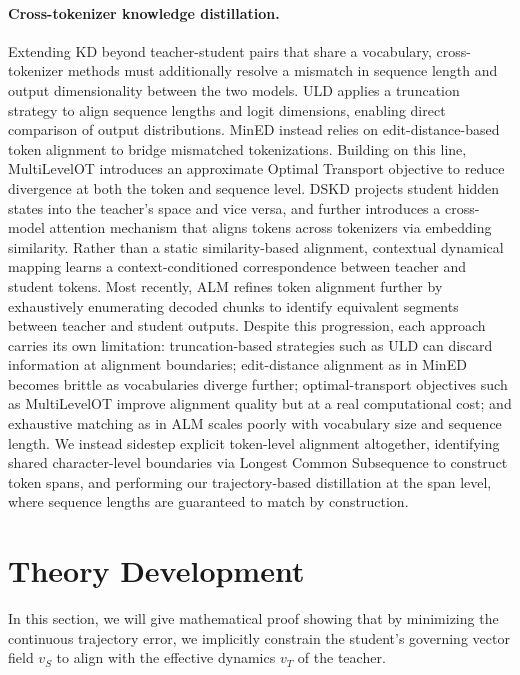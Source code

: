 \documentclass{article} %
\theoremstyle{definition}
\theoremstyle{remark}
\begin{document}
\paragraph{Cross-tokenizer knowledge distillation.} Extending KD beyond teacher-student pairs that share a vocabulary, cross-tokenizer methods must additionally resolve a mismatch in sequence length and output dimensionality between the two models. ULD \cite{boizard2025crosstokenizerdistillationuniversallogit} applies a truncation strategy to align sequence lengths and logit dimensions, enabling direct comparison of output distributions. MinED \cite{Wan2024KnowledgeFO} instead relies on edit-distance-based token alignment to bridge mismatched tokenizations. Building on this line, MultiLevelOT \cite{cui2025multileveloptimaltransportuniversal} introduces an approximate Optimal Transport objective to reduce divergence at both the token and sequence level. DSKD \cite{zhang2024dualspaceknowledgedistillationlarge} projects student hidden states into the teacher's space and vice versa, and further introduces a cross-model attention mechanism that aligns tokens across tokenizers via embedding similarity. Rather than a static similarity-based alignment, contextual dynamical mapping \cite{Chen2025EnhancingCK} learns a context-conditioned correspondence between teacher and student tokens. Most recently, ALM \cite{minixhofer2025universalcrosstokenizerdistillationapproximate} refines token alignment further by exhaustively enumerating decoded chunks to identify equivalent segments between teacher and student outputs. Despite this progression, each approach carries its own limitation: truncation-based strategies such as ULD can discard information at alignment boundaries; edit-distance alignment as in MinED becomes brittle as vocabularies diverge further; optimal-transport objectives such as MultiLevelOT improve alignment quality but at a real computational cost; and exhaustive matching as in ALM scales poorly with vocabulary size and sequence length. We instead sidestep explicit token-level alignment altogether, identifying shared character-level boundaries via Longest Common Subsequence to construct token spans, and performing our trajectory-based distillation at the span level, where sequence lengths are guaranteed to match by construction.
\section{Theory Development}
In this section, we will give mathematical proof showing that by minimizing the continuous trajectory error, we implicitly constrain the student's governing vector field $v_S$ to align with the effective dynamics $v_T$ of the teacher. 
\end{document}
